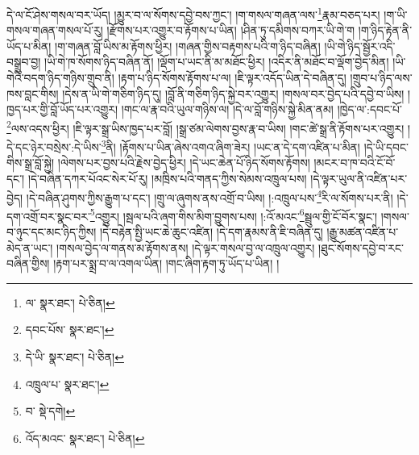 དེ་ལ་ངོ་ཤེས་གསལ་བར་ཡོད། །མྱུར་བ་ལ་སོགས་དབྱེ་བས་ཀྱང་། །ག་གསལ་གཞན་ལས་\footnote{ལ་  སྣར་ཐང་།  པེ་ཅིན། }རྣམ་བཅད་པར། །ག་ཡི་གསལ་གཞན་གསལ་པོ་རུ། །རྫོགས་པར་འགྱུར་བ་རྟོགས་པ་ཡིན། །ཤིན་ཏུ་དམིགས་བཀར་ཡི་གེ་ག །ག་ཉིད་རྟེན་ནི་ཡོད་པ་མིན། །ག་གཞན་བློ་ཡིས་མ་རྟོགས་ཕྱིར། །གཞན་གྱིས་བརྟགས་པའི་ག་ཉིད་བཞིན། །ཡི་གེ་ཉིད་སྦྱོར་འདི་བསྒྲུབ་བྱ། །ཡི་གེ་ཁ་སོགས་ཉིད་བཞིན་ནོ། །ལྡོག་པ་ཡང་ནི་མ་མཐོང་ཕྱིར། །འདིར་ནི་མཐོང་བ་ལྡོག་བྱེད་མིན། །ཡི་གེའི་བདག་ཉིད་གཉིས་གྲུབ་ནི། །རྟག་པ་ཉིད་སོགས་རྟོགས་པ་ལ། །ཇི་ལྟར་འདོད་ཡིན་དེ་བཞིན་དུ། །གྲུབ་པ་ཉིད་ལས་ཁས་བླང་གིས། །དེས་ན་ཡི་གེ་གཅིག་ཉིད་དུ། །བློ་ནི་གཅིག་ཉིད་སྐྱེ་བར་འགྱུར། །གསལ་བར་བྱེད་པའི་དབྱེ་བ་ཡིས། །ཁྱད་པར་གྱི་བློ་ཡོད་པར་འགྱུར། །གང་ལ་རྣ་བའི་ཡུལ་གཉིས་ལ། །དེ་ལ་བློ་གཉིས་སྐྱེ་མིན་ནམ། །ཁྱེད་ལ་:དབང་པོ་\footnote{དབང་པོས་  སྣར་ཐང་། }ལས་འདས་ཕྱིར། །ཇི་ལྟར་སྒྲ་ཡིས་ཁྱད་པར་བློ། །སྒྲ་ཙམ་ལེགས་བྱས་རྣ་བ་ཡིས། །གང་ཚེ་སྒྲ་ནི་རྟོགས་པར་འགྱུར། །དེ་དང་ཉེར་བསྲེས་:དེ་ཡིས་\footnote{དེ་ཡི་  སྣར་ཐང་།  པེ་ཅིན། }ནི། །རྟོགས་པ་ཡིན་ཞེས་འགའ་ཞིག་ཟེར། །ཡང་ན་དེ་དག་འཛིན་པ་མིན། །དེ་ཡི་དབང་གིས་སྒྲ་བློ་སྐྱེ། །ལེགས་པར་བྱས་པའི་རྗེས་བྱེད་ཕྱིར། །དེ་ཡང་ཆེན་པོ་ཉིད་སོགས་རྟོགས། །མངར་བ་ཁ་བའི་ངོ་བོ་དང་། །དེ་བཞིན་དཀར་པོའང་སེར་པོ་རུ། །མཁྲིས་པའི་གནད་ཀྱིས་སེམས་འཁྲུལ་པས། །དེ་ལྟར་ཡུལ་ནི་འཛིན་པར་བྱེད། །དེ་བཞིན་ཤུགས་ཀྱིས་རྒྱུག་པ་དང་། །གྲུ་ལ་ཞུགས་ནས་འགྲོ་བ་ཡིས། །:འཁྲུལ་པས་\footnote{འཁྲུལ་པ་  སྣར་ཐང་། }རི་ལ་སོགས་པར་ནི། །དེ་དག་འགྲོ་བར་སྣང་བར་\footnote{བ་  སྡེ་དགེ། }འགྱུར། །སྦལ་པའི་ཞག་གིས་མིག་བྱུགས་པས། །:འོ་མའང་\footnote{འོད་མའང་  སྣར་ཐང་།  པེ་ཅིན། }སྦྲུལ་གྱི་ངོ་བོར་སྣང་། །གསལ་བ་ཉུང་དང་མང་ཉིད་ཀྱིས། །དེ་བརྟེན་སྤྱི་ཡང་ཆེ་ཆུང་འཛིན། །དེ་དག་རྣམས་ནི་ཇི་བཞིན་དུ། །རྒྱུ་མཚན་འཛིན་པ་མེད་ན་ཡང་། །གསལ་བྱེད་ལ་གནས་མ་རྟོགས་ནས། །དེ་ལྟར་གསལ་བྱ་ལ་འཁྲུལ་འགྱུར། །ཐུང་སོགས་དབྱེ་བ་རང་བཞིན་གྱིས། །རྟག་པར་སྨྲ་བ་ལ་འགལ་ཡིན། །གང་ཞིག་རྟག་ཏུ་ཡོད་པ་ཡིན། །
